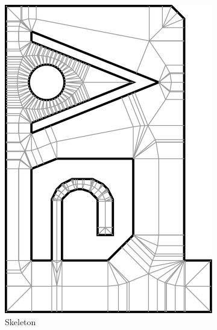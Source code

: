 \begin{figure}
\centering
\setlength{\figwidth}{0.19\textwidth}
\begin{subfigure}{\figwidth}
\centering
\includegraphics[width=\columnwidth]{sources/method/overview/skeleton.pdf}
\caption{Skeleton}\label{overview_fig_skeleton}
\end{subfigure}
\begin{subfigure}{\figwidth}
\centering

\end{subfigure}
\end{figure}
